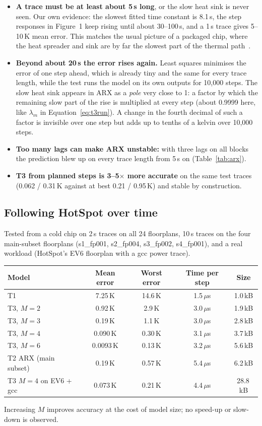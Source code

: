 \documentclass[11pt,a4paper]{article}
\newcommand{\us}{\,$\mu$s}
\begin{document}
\begin{itemize}
  \item \textbf{A trace must be at least about 5\,s long}, or the slow heat sink is never seen. Our
        own evidence: the slowest fitted time constant is 8.1\,s, the step responses in Figure~1
        keep rising until about 30--100\,s, and a 1\,s trace gives 5--10\,K mean error. This
        matches the usual picture of a packaged chip, where the heat spreader and sink are by far
        the slowest part of the thermal path~\cite{skadron03,hotspot}.
  \item \textbf{Beyond about 20\,s the error rises again.} Least squares minimises the error of one
        step ahead, which is already tiny and the same for every trace length, while the test runs
        the model on its own outputs for 10{,}000 steps. The slow heat sink appears in ARX as a
        \emph{pole} very close to 1: a factor by which the remaining slow part of the rise is
        multiplied at every step (about 0.9999 here, like $\lambda_m$ in
        Equation~\eqref{eq:t3run}). A change in the fourth decimal of such a factor is invisible
        over one step but adds up to tenths of a kelvin over 10{,}000 steps.
  \item \textbf{Too many lags can make ARX unstable:} with three lags on all blocks the prediction
        blew up on every trace length from 5\,s on (Table~\ref{tab:arx}).
  \item \textbf{T3 from planned steps is 3--5$\times$ more accurate} on the same test traces
        (0.062 / 0.31\,K against at best 0.21 / 0.95\,K) and stable by construction.
\end{itemize}

\subsection{Following HotSpot over time}
Tested from a cold chip on 2\,s traces on all 24 floorplans, 10\,s traces on the four main-subset
floorplans (s1\_fp001, s2\_fp004, s3\_fp002, s4\_fp001), and a real workload (HotSpot's EV6
floorplan with a gcc power trace).

\begin{center}
\small
\begin{tabular}{@{}l c c c c@{}}
\toprule
Model & Mean error & Worst error & Time per step & Size \\
\midrule
T1 & 7.25\,K & 14.6\,K & 1.5\us & 1.0\,kB \\
T3, $M=2$ & 0.92\,K & 2.9\,K & 3.0\us & 1.9\,kB \\
T3, $M=3$ & 0.19\,K & 1.1\,K & 3.0\us & 2.8\,kB \\
T3, $M=4$ & 0.090\,K & 0.30\,K & 3.1\us & 3.7\,kB \\
T3, $M=6$ & 0.0093\,K & 0.13\,K & 3.2\us & 5.6\,kB \\
T2 ARX (main subset) & 0.19\,K & 0.57\,K & 5.4\us & 6.2\,kB \\
T3 $M=4$ on EV6 + gcc & 0.073\,K & 0.21\,K & 4.4\us & 28.8\,kB \\
\bottomrule
\end{tabular}
\end{center}
Increasing $M$ improves accuracy at the cost of model size; no speed-up or slow-down is observed.
\end{document}
